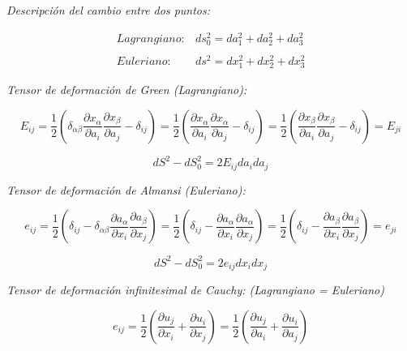 \documentclass[a4paper,10pt,twoside,final,spanish]{article}
\begin{document}
\textit{Descripción del cambio entre dos puntos:}

\begin{eqnarray}
Lagrangiano: & ds_{0}^{2}=da_{1}^{2}+da_{2}^{2}+da_{3}^{2} \\
             &                                   \nonumber \\
Euleriano:   & ds^{2}=dx_{1}^{2}+dx_{2}^{2}+dx_{3}^{2}
\end{eqnarray}

\textit{Tensor de deformación de Green (Lagrangiano):}

\begin{equation}
E_{ij}=\frac{1}{2}\left(
\delta_{\alpha\beta}
\frac{\partial x_{\alpha}}{\partial a_{i}}
\frac{\partial x_{\beta}}{\partial a_{j}}-\delta_{ij}
\right)
=
\frac{1}{2}\left(
\frac{\partial x_{\alpha}}{\partial a_{i}}
\frac{\partial x_{\alpha}}{\partial a_{j}}-\delta_{ij}
\right)
=
\frac{1}{2}\left(
\frac{\partial x_{\beta}}{\partial a_{i}}
\frac{\partial x_{\beta}}{\partial a_{j}}-\delta_{ij}
\right)=E_{ji}
\end{equation}

\begin{equation}
dS^{2}-dS_{0}^{2}=2E_{ij}da_{i}da_{j}
\end{equation}

\textit{Tensor de deformación de Almansi (Euleriano):}

\begin{equation}
e_{ij}=\frac{1}{2}\left(
\delta_{ij}-
\delta_{\alpha\beta}
\frac{\partial a_{\alpha}}{\partial x_{i}}
\frac{\partial a_{\beta}}{\partial x_{j}}
\right)
=
\frac{1}{2}\left(
\delta_{ij}-
\frac{\partial a_{\alpha}}{\partial x_{i}}
\frac{\partial a_{\alpha}}{\partial x_{j}}
\right)
=
\frac{1}{2}\left(
\delta_{ij}-
\frac{\partial a_{\beta}}{\partial x_{i}}
\frac{\partial a_{\beta}}{\partial x_{j}}
\right)=e_{ji}
\end{equation}

\begin{equation}
dS^{2}-dS_{0}^{2}=2e_{ij}dx_{i}dx_{j}
\end{equation}

\textit{Tensor de deformación infinitesimal de Cauchy: (Lagrangiano = Euleriano)}

\begin{equation}
e_{ij}=\frac{1}{2}\left(
\frac{\partial u_{j}}{\partial x_{i}}+
\frac{\partial u_{i}}{\partial x_{j}}
\right)
=
\frac{1}{2}\left(
\frac{\partial u_{j}}{\partial a_{i}}+
\frac{\partial u_{i}}{\partial a_{j}}
\right)
\end{equation}
\end{document}
